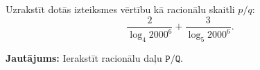 \documentclass[a4paper,12pt]{article}
\newcommand\answer[1]{}
\begin{document}
\vspace{10pt}
\begin{problem}
Uzrakstīt dotās izteiksmes vērtību kā racionālu skaitli $p/q$:
\[ \frac{2}{\log_4 2000^6} + \frac{3}{\log_5 2000^6}. \]

{\bf Jautājums:} Ierakstīt racionālu daļu $\mathtt{P/Q}$.
\answer{

{\bf Atbilde.} $\mathtt{1/6}$

Pārrakstām doto izteiksmi $E$, izmantojot dažas logaritmu īpašības (kāpinātāju var iznest pirms 
logaritma, $\log_a b = 1/(\log_b a)$ u.c.). 

\begin{align}
E = & \frac{2}{\log_4 2000^6} + \frac{3}{\log_5 2000^6} = \nonumber \\
 = & \frac{2}{6 \log_4 2000} + \frac{3}{6 \log_5 2000} = \nonumber \\
 = & \frac{1}{3} \cdot \frac{1}{\log_4 2000} + \frac{1}{2}\cdot \frac{1}{\log_5 2000} = \nonumber \\
 = & \frac{1}{3}\log_{2000} 4 + \frac{1}{2}\log_{2000} 5 = \nonumber \\
 = & \frac{1}{6}\left( 2 \log_{2000} 4 + 3 \log_{2000} 5 \right) = \nonumber \\
 = & \frac{1}{6}\left( \log_{2000} 4^2 + \log_{2000} 5^3 \right) = \nonumber \\
 = & \frac{1}{6} \log_{2000} \left( 4^2 \cdot 5^3 \right)  = \nonumber \\
 = & \frac{1}{6} \log_{2000} 2000  = \frac{1}{6}.\nonumber 
\end{align} 
}
\end{problem}
\end{document}
